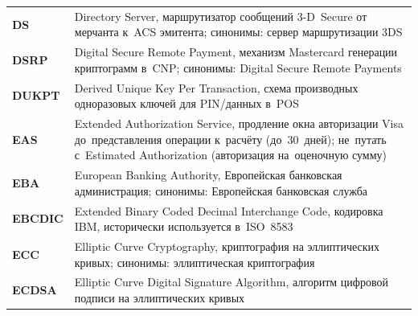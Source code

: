 \begin{longtable}{@{}p{4.5em}p{\dimexpr\linewidth-4.5em-2\tabcolsep\relax}@{}}
  \textbf{DS}                & Directory Server, маршрутизатор сообщений 3-D~Secure от мерчанта к~ACS эмитента; синонимы: сервер маршрутизации 3DS                                                                                                                                                                              \\
  \textbf{DSRP}              & Digital Secure Remote Payment, механизм Mastercard генерации криптограмм в~CNP; синонимы: Digital Secure Remote Payments                                                                                                                                                                         \\
  \textbf{DUKPT}             & Derived Unique Key Per Transaction, схема производных одноразовых ключей для PIN/данных в~POS                                                                                                                                                                                                    \\
  \textbf{EAS}               & Extended Authorization Service, продление окна авторизации Visa до~представления операции к~расчёту (до~30~дней); не~путать с~Estimated Authorization (авторизация на~оценочную сумму)                                                                                                                                                            \\
  \textbf{EBA}               & European Banking Authority, Европейская банковская администрация; синонимы: Европейская банковская служба                                                                                                                                                                                        \\
  \textbf{EBCDIC}            & Extended Binary Coded Decimal Interchange Code, кодировка IBM, исторически используется в~ISO~8583                                                                                                                                                                                               \\
  \textbf{ECC}               & Elliptic Curve Cryptography, криптография на эллиптических кривых; синонимы: эллиптическая криптография                                                                                                                                                                                          \\
  \textbf{ECDSA}             & Elliptic Curve Digital Signature Algorithm, алгоритм цифровой подписи на эллиптических кривых                                                                                                                                                                                                    \\

\end{longtable}
